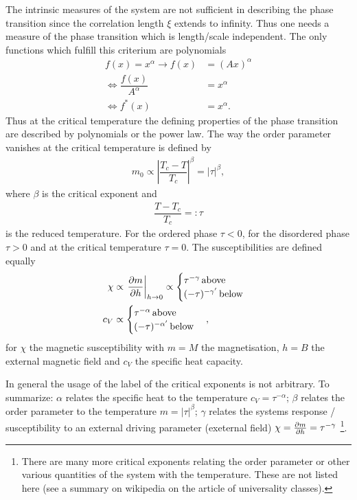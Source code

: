 \documentclass[a4paper,10pt]{article}
\numberwithin{equation}{section}
\begin{document}
\begin{multicols}{2}
The intrinsic measures of the system are not sufficient in describing the phase transition since the correlation length $\xi $ extends to infinity.
Thus one needs a measure of the phase transition which is length/scale independent.
The only functions which fulfill this criterium are polynomials
\begin{align} 
  f(x) = x^\alpha \rightarrow f(x) &= (Ax)^\alpha \\
  \Leftrightarrow \dfrac{f(x)}{A^\alpha } &= x^\alpha \\
  \Leftrightarrow f^*(x) &= x^\alpha 
.\end{align} 
Thus at the critical temperature the defining properties of the phase transition are described by polynomials or the power law.
The way the order parameter vanishes at the critical temperature is defined by
\begin{align} 
  m_0\propto \left|\dfrac{T_c-T}{T_c}\right|^\beta =|\tau |^\beta 
,\end{align} 
where $\beta $ is the critical exponent and 
\begin{align} 
  \dfrac{T-T_c}{T_c}=:\tau 
\end{align} 
is the reduced temperature.
For the ordered phase $\tau <0$, for the disordered phase $\tau >0$ and at the critical temperature $\tau =0$.
The susceptibilities are defined equally
\begin{align} 
  \chi  &\propto \left.\diffp[]{m}{h}\right|_{h\rightarrow 0}\propto \begin{cases}
    \tau ^{-\gamma }\, \text{above}\\
    (-\tau )^{-\gamma '} \, \text{below}\\
  \end{cases}\\
  c_V &\propto \begin{cases}
    \tau ^{-\alpha }\, \text{above}\\
    (-\tau )^{-\alpha '}\, \text{below}
  \end{cases}
,\end{align} 
for $\chi $ the magnetic susceptibility with $m=M$ the magnetisation, $h=B$ the external magnetic field and $c_V$ the specific heat capacity.

In general the usage of the label of the critical exponents is not arbitrary.
To summarize:
$\alpha $ relates the specific heat to the temperature $c_V=\tau ^{-\alpha }$; $\beta $ relates the order parameter to the temperature $m=|\tau |^{\beta }$; $\gamma $ relates the systems response / susceptibility to an external driving parameter (exeternal field) $\chi =\diffp[]{m}{h}=\tau ^{-\gamma }$
\footnote{There are many more critical exponents relating the order parameter or other various quantities of the system with the temperature.
These are not listed here (see a summary on wikipedia on the article of universality classes).}.


\end{multicols}
\end{document}
